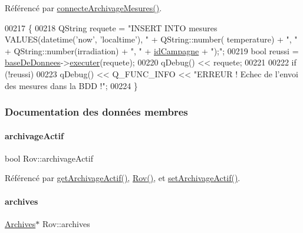 Référencé par \hyperlink{class_rov_a738965ca84678b506b3d6a326c48e9e3}{connecte\+Archivage\+Mesures()}.


\begin{DoxyCode}
00217 \{
00218     QString requete = \textcolor{stringliteral}{"INSERT INTO mesures VALUES(datetime('now', 'localtime'), "} + QString::number(
      temperature) + \textcolor{stringliteral}{", "} + QString::number(irradiation) + \textcolor{stringliteral}{", "} + \hyperlink{class_rov_aaaed58cd7ee9edbeab5251cd413a1bae}{idCampagne} + \textcolor{stringliteral}{");"};
00219     \textcolor{keywordtype}{bool} reussi = \hyperlink{class_rov_a5a9a824cd100947c75d0951eb9e1f90c}{baseDeDonnees}->\hyperlink{class_base_de_donnees_aa8de5f8f8bb17edc43f5c0ee33712081}{executer}(requete);
00220     qDebug() << requete;
00221 
00222     \textcolor{keywordflow}{if} (!reussi)
00223         qDebug() << Q\_FUNC\_INFO << \textcolor{stringliteral}{"ERREUR ! Echec de l'envoi des mesures dans la BDD !"};
00224 \}
\end{DoxyCode}


\subsubsection{Documentation des données membres}
\mbox{\label{class_rov_a659da5fe3636356b006a8e08a8433dd3}} 
\paragraph{\texorpdfstring{archivage\+Actif}{archivageActif}}
{\footnotesize\ttfamily bool Rov\+::archivage\+Actif\hspace{0.3cm}{\ttfamily [private]}}



Référencé par \hyperlink{class_rov_ac24b94eaac569252bdc0b1919489a761}{get\+Archivage\+Actif()}, \hyperlink{class_rov_a5dddd3bd156c134848078296087d090c}{Rov()}, et \hyperlink{class_rov_abbe2eb87a00b651c8259c0c7abca3edd}{set\+Archivage\+Actif()}.

\mbox{\label{class_rov_ad41ed46f169f28da226a979f70c4d8a4}} 
\paragraph{\texorpdfstring{archives}{archives}}
{\footnotesize\ttfamily \hyperlink{class_archives}{Archives}$\ast$ Rov\+::archives\hspace{0.3cm}{\ttfamily [private]}}



